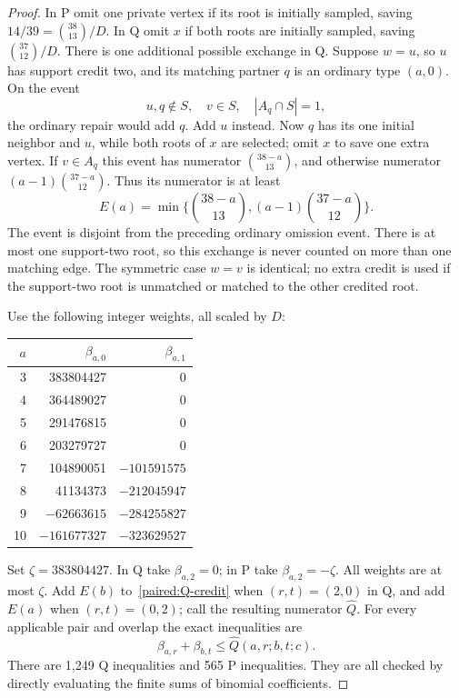 \documentclass[11pt,a4paper]{article}
\theoremstyle{definition}\newtheorem{definition}[theorem]{Definition}
\theoremstyle{remark}\newtheorem{remark}[theorem]{Remark}
\begin{document}
\begin{proof}
In P omit one private vertex if its root is initially sampled, saving
$14/39=\binom{38}{13}/D$. In Q omit $x$ if both roots are initially
sampled, saving $\binom{37}{12}/D$. There is one additional possible
exchange in Q. Suppose $w=u$, so $u$ has support credit two, and
its matching partner $q$ is an ordinary type $(a,0)$. On the event
\[
 u,q\notin S,\quad v\in S,\quad |A_q\cap S|=1,
\]
the ordinary repair would add $q$. Add $u$ instead. Now $q$ has
its one initial neighbor and $u$, while both roots of $x$ are
selected; omit $x$ to save one extra vertex. If $v\in A_q$ this
event has numerator $\binom{38-a}{13}$, and otherwise numerator
$(a-1)\binom{37-a}{12}$. Thus its numerator is at least
\begin{equation}\label{paired:exchange39}
 E(a)=\min\{\binom{38-a}{13},(a-1)\binom{37-a}{12}\}.
\end{equation}
The event is disjoint from the preceding ordinary omission event.
There is at most one support-two root, so this exchange is never
counted on more than one matching edge. The symmetric case $w=v$
is identical; no extra credit is used if the support-two root is
unmatched or matched to the other credited root.

Use the following integer weights, all scaled by $D$:
\begin{center}\small
\begin{tabular}{rrr}
\toprule
$a$&$\beta_{a,0}$&$\beta_{a,1}$\\\midrule
3&383804427&0\\
4&364489027&0\\
5&291476815&0\\
6&203279727&0\\
7&104890051&$-101591575$\\
8&41134373&$-212045947$\\
9&$-62663615$&$-284255827$\\
10&$-161677327$&$-323629527$\\\bottomrule
\end{tabular}
\end{center}
Set $\zeta=383804427$. In Q take $\beta_{a,2}=0$; in P take
$\beta_{a,2}=-\zeta$. All weights are at most $\zeta$. Add $E(b)$
to~\eqref{paired:Q-credit} when $(r,t)=(2,0)$ in Q, and add $E(a)$
when $(r,t)=(0,2)$; call the resulting numerator $\widehat Q$.
For every applicable pair and overlap the exact inequalities are
\[
 \beta_{a,r}+\beta_{b,t}\le\widehat Q(a,r;b,t;c).
\]
There are 1,249 Q inequalities and 565 P inequalities. They are all
checked by directly evaluating the finite sums of binomial coefficients.


\end{proof}
\end{document}
